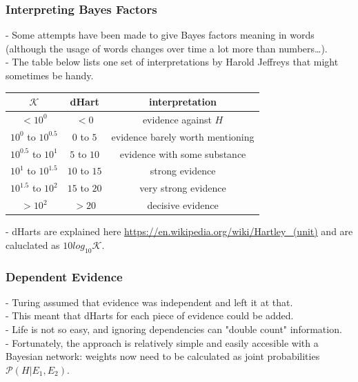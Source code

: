 \documentclass[•]{beamer}
\begin{document}
	\begin{frame}
		\frametitle{Interpreting Bayes Factors}
		- Some attempts have been made to give Bayes factors meaning in words (although the usage of words changes over time a lot more than numbers\ldots).\\
		- The table below lists one set of interpretations by Harold Jeffreys that might sometimes be handy.\\
\begin{small}
		\begin{center}
			\begin{tabular}{|c | c | c|}
				\hline
				$\mathcal{K}$ & dHart & interpretation\\
				\hline
				$<10^{0}$ & $<0$ & evidence against $H$\\
				$10^{0}$ to $10^{0.5}$ & $0$ to $5$ & evidence barely worth mentioning\\
				$10^{0.5}$ to $10^{1}$ & $5$ to $10$ & evidence with some substance\\
				$10^{1}$ to $10^{1.5}$ & $10$ to $15$ & strong evidence\\
				$10^{1.5}$ to $10^{2}$ & $15$ to $20$ & very strong evidence\\
				$>10^{2}$ & $>20$ & decisive evidence\\
				\hline
			\end{tabular}
		\end{center}
\end{small}
{\footnotesize 		- dHarts are explained here \url{https://en.wikipedia.org/wiki/Hartley_(unit)} and are caluclated as $10log_{10}\mathcal{K}$.}
	\end{frame}
	\begin{frame}
	\frametitle{Dependent Evidence}
	- Turing assumed that evidence was independent and left it at that.\\
	- This meant that dHarts for each piece of evidence could be added.\\
	- Life is not so easy, and ignoring dependencies can "double count" information.\\
	- Fortunately, the approach is relatively simple and easily accesible with a Bayesian network: weights now need to be calculated as joint probabilities $\mathcal{P}(H | E_{1}, E_{2})$.\\
	\end{frame}
\end{document}
